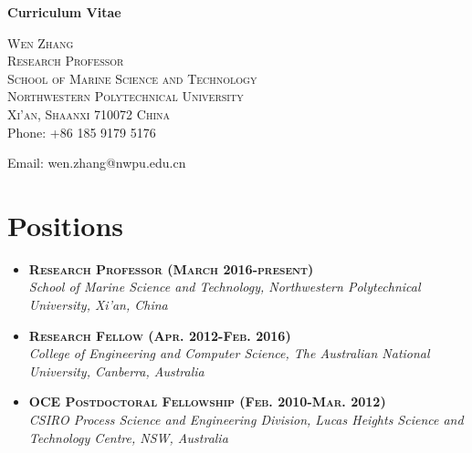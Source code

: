 \documentclass[10pt]{article}
\begin{document}
\thispagestyle{plain}
\begin{center}
\begin{huge}
\textbf{Curriculum Vitae}\\
\end{huge}
\end{center}

\begin{center}
\begin{large}
\textsc{Wen Zhang\\
Research Professor\\
School of Marine Science and Technology\\
Northwestern Polytechnical University\\
Xi'an, Shaanxi 710072 China\\
}
Phone: +86 185 9179 5176

Email: wen.zhang@nwpu.edu.cn
\end{large}
\end{center}


\section*{Positions}
\begin{itemize}
\item \textsc{\textbf{Research Professor (March 2016-present)}}\\
\emph{School of Marine Science and Technology, Northwestern Polytechnical University, Xi'an, China}\\

\item \textsc{\textbf{Research Fellow (Apr. 2012-Feb. 2016)}}\\
\emph{College of Engineering and Computer Science, The Australian National University, Canberra, Australia}\\

\item \textsc{\textbf{OCE Postdoctoral Fellowship (Feb. 2010-Mar. 2012)}}\\
\emph{CSIRO Process Science and Engineering Division, Lucas Heights Science and Technology Centre, NSW, Australia}\\

\end{itemize}
\end{document}
